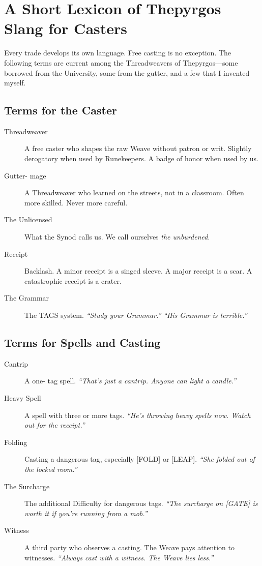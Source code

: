 \chapter{A Short Lexicon of Thepyrgos Slang for Casters}

Every trade develops its own language. Free casting is no exception. The following terms are current among the Threadweavers of Thepyrgos---some borrowed from the University, some from the gutter, and a few that I invented myself.

\section{Terms for the Caster}

\begin{description}
    \item[Threadweaver] A free caster who shapes the raw Weave without patron or writ. Slightly derogatory when used by Runekeepers. A badge of honor when used by us.
    \item[Gutter- mage] A Threadweaver who learned on the streets, not in a classroom. Often more skilled. Never more careful.
    \item[The Unlicensed] What the Synod calls us. We call ourselves \emph{the unburdened}.
    \item[Receipt] Backlash. A minor receipt is a singed sleeve. A major receipt is a scar. A catastrophic receipt is a crater.
    \item[The Grammar] The TAGS system. \emph{``Study your Grammar.''} \emph{``His Grammar is terrible.''}
\end{description}

\section{Terms for Spells and Casting}

\begin{description}
    \item[Cantrip] A one- tag spell. \emph{``That's just a cantrip. Anyone can light a candle.''}
    \item[Heavy Spell] A spell with three or more tags. \emph{``He's throwing heavy spells now. Watch out for the receipt.''}
    \item[Folding] Casting a dangerous tag, especially [FOLD] or [LEAP]. \emph{``She folded out of the locked room.''}
    \item[The Surcharge] The additional Difficulty for dangerous tags. \emph{``The surcharge on [GATE] is worth it if you're running from a mob.''}
    \item[Witness] A third party who observes a casting. The Weave pays attention to witnesses. \emph{``Always cast with a witness. The Weave lies less.''}
\end{description}

